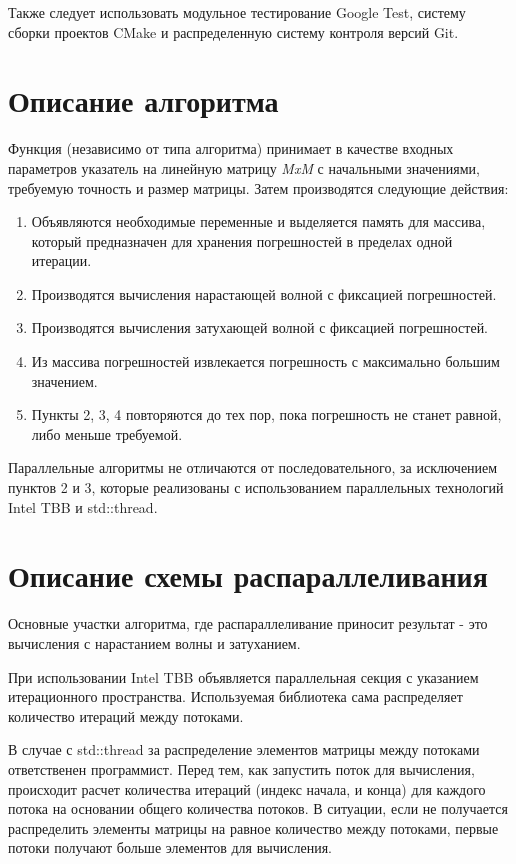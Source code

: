 \documentclass{report}
\begin{document}
\par Также следует использовать модульное тестирование Google Test, систему сборки проектов CMake и распределенную систему контроля версий Git.
\newpage

\section*{Описание алгоритма}
\par Функция (независимо от типа алгоритма) принимает в качестве входных параметров указатель на линейную матрицу {\textit{MxM}} с начальными значениями, требуемую точность и размер матрицы. Затем производятся следующие действия:
\begin{enumerate}
\item Объявляются необходимые переменные и выделяется память для массива, который предназначен для хранения погрешностей в пределах одной итерации.
\item Производятся вычисления нарастающей волной с фиксацией погрешностей.
\item Производятся вычисления затухающей волной с фиксацией погрешностей.
\item Из массива погрешностей извлекается погрешность с максимально большим значением.
\item Пункты 2, 3, 4 повторяются до тех пор, пока погрешность не станет равной, либо меньше требуемой.
\end{enumerate}
\par Параллельные алгоритмы не отличаются от последовательного, за исключением пунктов 2 и 3, которые реализованы с использованием параллельных технологий Intel TBB и std::thread.
\newpage

\section*{Описание схемы распараллеливания}
\par Основные участки алгоритма, где распараллеливание приносит результат - это вычисления с нарастанием волны и затуханием.
\par При использовании Intel TBB объявляется параллельная секция с указанием итерационного пространства. Используемая библиотека сама распределяет количество итераций между потоками.
\par В случае с std::thread за распределение элементов матрицы между потоками ответственен
программист. Перед тем, как запустить поток для вычисления, происходит расчет количества
итераций (индекс начала, и конца) для каждого потока на основании общего количества потоков. В ситуации, если не получается распределить элементы матрицы на равное количество между потоками, первые
потоки получают больше элементов для вычисления.
\newpage
\end{document}
